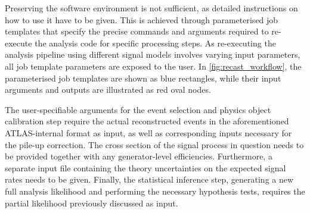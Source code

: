 Preserving the software environment is not sufficient, as detailed instructions on how to use it have to be given. This is achieved through parameterised job templates that specify the precise commands and arguments required to re-execute the analysis code for specific processing steps. As re-executing the analysis pipeline using different signal models involves varying input parameters, all job template parameters are exposed to the user. In \cref{fig:recast_workflow}, the parameterised job templates are shown as blue rectangles, while their input arguments and outputs are illustrated as red oval nodes. 

The user-specifiable arguments for the event selection and physics object calibration step require the actual reconstructed events in the aforementioned ATLAS-internal format as input, as well as corresponding inputs necessary for the pile-up correction. The cross section of the signal process in question needs to be provided together with any generator-level efficiencies. Furthermore, a separate input file containing the theory uncertainties on the expected signal rates needs to be given. Finally, the statistical inference step, generating a new full analysis likelihood and performing the necessary hypothesis tests, requires the partial likelihood previously discussed as input.

